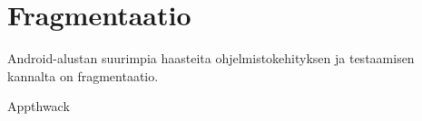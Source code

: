\section{Fragmentaatio}

Android-alustan suurimpia haasteita ohjelmistokehityksen ja testaamisen kannalta on fragmentaatio.

Appthwack\cite{appthwack}




